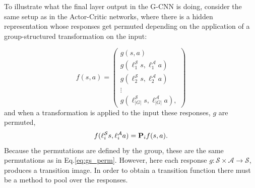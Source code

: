 To illustrate what the final layer output in the G-CNN is doing, consider the same setup as in the Actor-Critic networks, where there is a hidden representation whose responses get permuted depending on the application of a group-structured transformation on the input:

\begin{equation}
	f(s , a) = \begin{pmatrix}
		g(s, a)                                     \\
		g(\ell_1^\mathcal{S}s,\ell^\mathcal{A}_1a)  \\
		g(\ell^\mathcal{S}_2s, \ell^\mathcal{A}_2a) \\
		\vdots                                      \\
		g(\ell_{|G|}^\mathcal{S}s, \ell^\mathcal{A}_{|G|}a),
	\end{pmatrix}
\end{equation}
and when a transformation is applied to the input these responses, $g$ are permuted,
\begin{equation}\label{eq:tm_gcnn}
	f(\ell_i^\mathcal{S}s, \ell_i^\mathcal{A}a) = \mathbf{P}_i f(s, a).
\end{equation}
Because the permutations are defined by the group, these are the same permutations as in Eq.\ref{eq:gs_perm}. However, here each response $g: \mathcal{S} \times \mathcal{A} \rightarrow \mathcal{S}$, produces a transition image. In order to obtain a transition function there must be a method to pool over the responses.

